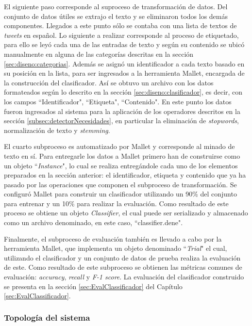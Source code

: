 El siguiente paso corresponde al suproceso de transformación de datos. Del conjunto de datos útiles se extrajo el texto y se eliminaron todos los demás componentes. Llegados a este punto sólo se contaba con una lista de textos de \textit{tweets} en español. Lo siguiente a realizar corresponde al proceso de etiquetado, para ello se leyó cada una de las entradas de texto y según su contenido se ubicó manualmente en alguna de las categorías descritas en la sección \ref{sec:diseno:categorias}. Además se asignó un identificador a cada texto basado en su posición en la lista, para ser ingresados a la herramienta Mallet, encargada de la construcción del clasificador. Así se obtuvo un archivo con los datos formateados según lo descrito en la sección \ref{sec:diseno:clasificador}, es decir, con los campos ``Identificador", ``Etiqueta", ``Contenido". En este punto los datos fueron ingresados al sistema para la aplicación de los operadores descritos en la sección \ref{subsec:detectorNecesidades}, en particular la eliminación de \textit{stopwords}, normalización de texto y \textit{stemming}.

El cuarto subproceso es automatizado por Mallet y corresponde al minado de texto en sí. Para entregarle los datos a Mallet primero han de construirse como un objeto ``\textit{Instance}", lo cual se realiza entregándole cada uno de los elementos preparados en la sección anterior: el identificador, etiqueta y contenido que ya ha pasado por las operaciones que componen el subproceso de transformación. Se configuró Mallet para construir un clasificador utilizando un 90\% del conjunto para entrenar y un 10\% para realizar la evaluación. Como resultado de este proceso se obtiene un objeto \textit{Classifier}, el cual puede ser serializado y almacenado como un archivo denominado, en este caso, ``classifier.dene". 

Finalmente, el subproceso de evaluación también es llevado a cabo por la herramienta Mallet, que implementa un objeto denominado ``\textit{Trial}" el cual, utilizando el clasificador y un conjunto de datos de prueba realiza la evaluación de este. Como resultado de este subproceso se obtienen las métricas comunes de evaluación: \textit{accuracy}, \textit{recall} y \textit{F-1 score}. La evaluación del clasificador construido se presenta en la sección \ref{sec:EvalClassificador} del Capítulo \ref{sec:EvalClassificador}. 

\subsubsection*{Topología del sistema}
\label{subsubsec:topologiaSistema}

